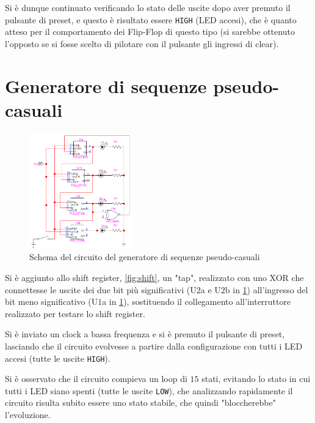 \documentclass[a4paper,10pt]{article}
\def\code#1{\texttt{#1}}
\begin{document}
Si è dunque continuato verificando lo stato delle uscite dopo aver premuto il pulsante di preset, e questo è risultato essere \code{HIGH} (LED accesi), che è quanto atteso per il comportamento dei Flip-Flop di questo tipo (si sarebbe ottenuto l'opposto se si fosse scelto di pilotare con il pulsante gli ingressi di clear).

\section{Generatore di sequenze pseudo-casuali}

\begin{figure}
	\vspace{-5pt}
	\centering
	\includegraphics[width=0.4\textwidth]{../grafici/randomseq.png}
	\vspace{-5pt}
	\caption{Schema del circuito del generatore di sequenze pseudo-casuali}
	\label{fig:random}
	\vspace{-5pt}
\end{figure}

Si è aggiunto allo shift register, \cref{fig:shift}, un "tap", realizzato con uno XOR che connettesse le uscite dei due bit più significativi (U$2$a e U$2$b in \cref{fig:random}) all'ingresso del bit meno significativo (U$1$a in \cref{fig:random}), sostituendo il collegamento all'interruttore realizzato per testare lo shift register.
\newline

Si è inviato un clock a bassa frequenza e si è premuto il pulsante di preset, lasciando che il circuito evolvesse a partire dalla configurazione con tutti i LED accesi (tutte le uscite \code{HIGH}).

Si è osservato che il circuito compieva un loop di $15$ stati, evitando lo stato in cui tutti i LED siano spenti (tutte le uscite \code{LOW}), che analizzando rapidamente il circuito risulta subito essere uno stato stabile, che quindi "bloccherebbe" l'evoluzione.
\end{document}
